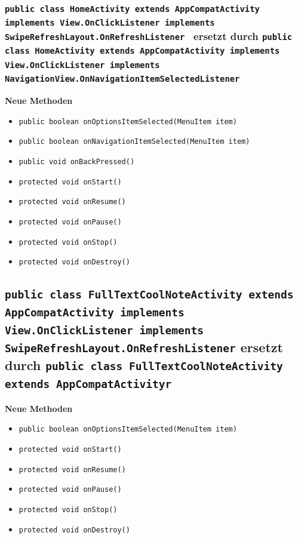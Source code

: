 \documentclass[a4paper]{scrreprt}
\begin{document}
	\subsubsection{\texttt{public class HomeActivity extends AppCompatActivity implements View.OnClickListener implements SwipeRefreshLayout.OnRefreshListener } ersetzt durch \texttt{public class HomeActivity extends AppCompatActivity implements View.OnClickListener implements NavigationView.OnNavigationItemSelectedListener }}
		\textbf{Neue Methoden}
		\begin{itemize}
			\item \texttt{public boolean onOptionsItemSelected(MenuItem item)}
			\item \texttt{public boolean onNavigationItemSelected(MenuItem item)}
			\item \texttt{public void onBackPressed()}
			\item \texttt{protected void onStart()}
			\item \texttt{protected void onResume()}
			\item \texttt{protected void onPause()}
			\item \texttt{protected void onStop()}
			\item \texttt{protected void onDestroy()}
		\end{itemize}
			
	\subsection{\texttt{public class FullTextCoolNoteActivity extends AppCompatActivity implements View.OnClickListener implements SwipeRefreshLayout.OnRefreshListener} ersetzt durch \texttt{public class FullTextCoolNoteActivity extends AppCompatActivityr}}
		\textbf{Neue Methoden}
		\begin{itemize}
			\item \texttt{public boolean onOptionsItemSelected(MenuItem item)}
			\item \texttt{protected void onStart()}
			\item \texttt{protected void onResume()}
			\item \texttt{protected void onPause()}
			\item \texttt{protected void onStop()}
			\item \texttt{protected void onDestroy()}
		\end{itemize}
			
\end{document}
